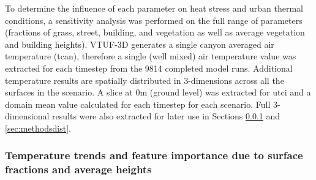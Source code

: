 \documentclass[final,3p,times,authoryear]{elsarticle}
\begin{document}

To determine the influence of each parameter on heat stress and urban thermal conditions, a sensitivity analysis was performed on the full range of parameters (fractions of grass, street, building, and vegetation as well as average vegetation and building heights). VTUF-3D generates a single canyon averaged air temperature (\gls{tcan}), therefore a single (well mixed) air temperature value was extracted for each timestep from the 9814 completed model runs. Additional temperature results are spatially distributed in 3-dimensions across all the surfaces in the scenario. A slice at 0m (ground level) was extracted for \gls{utci} and a domain mean value calculated for each timestep for each scenario. Full 3-dimensional results were also extracted for later use in Sections \ref{sec:methodstempvspercent} and \ref{sec:methodsdist}.



\subsubsection{Temperature trends and feature importance due to surface fractions and average heights}\label{sec:methodstempvspercent}
\end{document}
